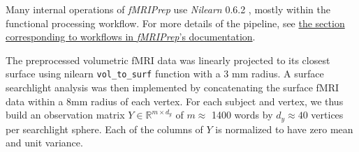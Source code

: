 \begin{description}
\end{description}

Many internal operations of \emph{fMRIPrep} use \emph{Nilearn} 0.6.2
\citep[RRID:SCR\_001362]{nilearn}, mostly within the functional
processing workflow. For more details of the pipeline, see
\href{https://fmriprep.readthedocs.io/en/latest/workflows.html}{the
section corresponding to workflows in \emph{fMRIPrep}'s documentation}.


The preprocessed volumetric fMRI data was linearly projected to its closest surface
using nilearn \texttt{vol\_to\_surf} function with a 3 mm radius. A surface searchlight
analysis was then implemented by concatenating the surface
fMRI data within a 8mm radius of each vertex. For each subject and vertex, we
thus build an observation matrix $Y \in \mathbb{R}^{m \times d_y}$ of $m\approx$ 1400 words
by $d_y\approx40$ vertices per searchlight sphere. Each
of the columns of $Y$ is normalized to have zero mean and unit variance.

